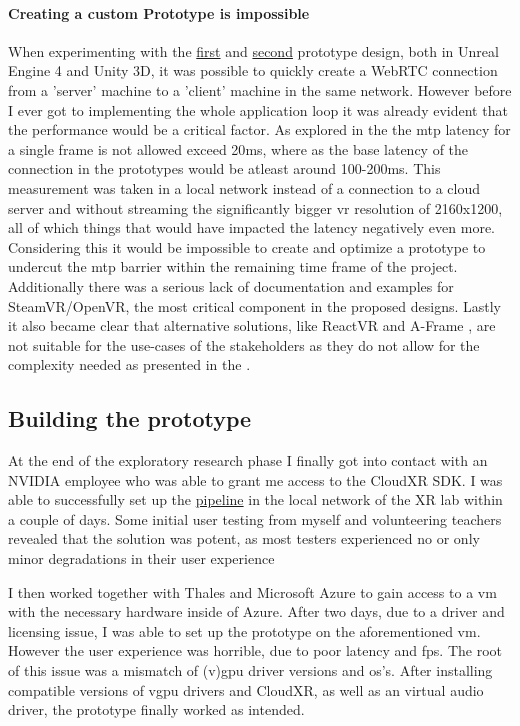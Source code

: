 \paragraph{Creating a custom Prototype is impossible}
When experimenting with the \hyperref[fig:pr11]{first} and \hyperref[fig:pr12]{second} prototype design, both in Unreal Engine 4 and Unity 3D, it was possible to quickly create a WebRTC connection from a 'server' machine to a 'client' machine in the same network. However before I ever got to implementing the whole application loop it was already evident that the performance would be a critical factor. As explored in the  the \acrfull{mtp} latency for a single frame is not allowed exceed 20\acrshort{ms}, where as the base latency of the connection in the prototypes would be atleast around 100-200\acrshort{ms}. This measurement was taken in a local network instead of a connection to a cloud server and without streaming the significantly bigger \acrshort{vr} resolution of 2160x1200, all of which things that would have impacted the latency negatively even more. Considering this it would be impossible to create and optimize a prototype to undercut the \acrshort{mtp} barrier within the remaining time frame of the project. Additionally there was a serious lack of documentation and examples for SteamVR/OpenVR, the most critical component in the proposed designs. Lastly it also became clear that alternative solutions, like ReactVR \parencite{reactVR} and A-Frame \parencite{aframe}, are not suitable for the use-cases of the stakeholders as they do not allow for the complexity needed as presented in the . \\

\subsection{Building the prototype}
At the end of the exploratory research phase I finally got into contact with an NVIDIA employee who was able to grant me access to the CloudXR SDK. I was able to successfully set up the \hyperref[fig:pr0]{pipeline} in the local network of the XR lab within a couple of days. Some initial user testing from myself and volunteering teachers revealed that the solution was potent, as most testers experienced no or only minor degradations in their user experience

I then worked together with Thales and Microsoft Azure to gain access to a \acrfull{vm} with the necessary hardware inside of Azure. After two days, due to a driver and licensing issue, I was able to set up the prototype on the aforementioned \acrshort{vm}. However the user experience was horrible, due to poor latency and \acrshort{fps}. The root of this issue was a mismatch of (v)\acrshort{gpu} driver versions and \acrfull{os}'s. After installing compatible versions of v\acrshort{gpu} drivers and CloudXR, as well as an virtual audio driver, the prototype finally worked as intended.

